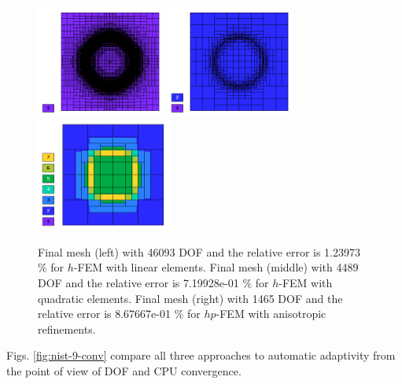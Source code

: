 \documentclass[12pt]{elsarticle}
\begin{document}
\begin{figure}[H]
\centering
\includegraphics[height=3.7cm]{nist/nist-9/mesh_h1_aniso.png}
\includegraphics[height=3.7cm]{nist/nist-9/mesh_h2_aniso.png}
\includegraphics[height=3.7cm]{nist/nist-9/mesh_hp_aniso.png}
\caption{
Final mesh (left) with 46093 DOF and the relative error is 1.23973 \% for $h$-FEM with linear elements.
Final mesh (middle) with 4489 DOF and the relative error is 7.19928e-01 \% for $h$-FEM with quadratic elements.
Final mesh (right) with 1465 DOF and the relative error is 8.67667e-01 \% for $hp$-FEM with anisotropic refinements.}
\label{fig:nist-9-hp-aniso}
\end{figure}

Figs. \ref{fig:nist-9-conv} compare all
three approaches to automatic adaptivity from the point
of view of DOF and CPU convergence.
\end{document}
